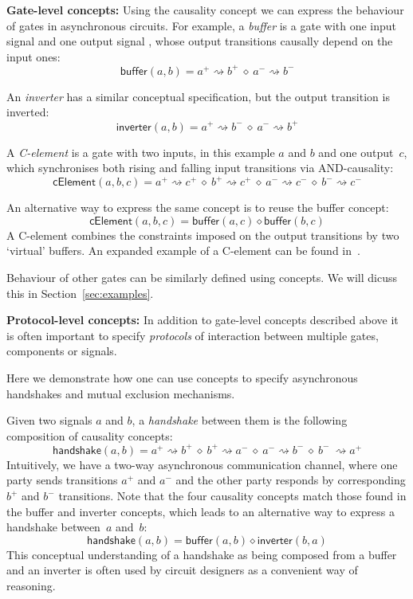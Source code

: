 \documentclass[british,conference,compsoc]{IEEEtran}
\begin{document}
\textbf{Gate-level concepts:} Using the causality concept we can express
the behaviour of gates in asynchronous circuits. For example, a \emph{buffer}
is a gate with one input signal and one output signal ,
whose output transitions causally depend on the input ones:
\[
\mathsf{buffer}(a, b)=a^{+}\rightsquigarrow b^{+}\ \diamond\
a^{-}\rightsquigarrow b^{-}
\]

\noindent An \emph{inverter} has a similar conceptual specification, but the
output transition is inverted:
\[
\mathsf{inverter}(a, b)=a^{+}\rightsquigarrow b^{-}\ \diamond\
a^{-}\rightsquigarrow b^{+}
\]

\noindent A \emph{C-element} is a gate with two inputs, in this example $a$ and $b$ and one
output~$c$, which synchronises both rising and falling input transitions
via AND-causality:
\[
\mathsf{cElement}(a, b, c)=a^{+}\!\rightsquigarrow\! c^{+}\ \diamond\
b^{+}\!\rightsquigarrow\! c^{+}\ \diamond\ a^{-}\!\rightsquigarrow\! c^{-}\
\diamond\ b^{-}\!\rightsquigarrow\! c^{-}
\]

An alternative way to express the same concept is to reuse the buffer concept:
\[
\mathsf{cElement}(a, b, c)=\mathsf{buffer}(a, c) \diamond \mathsf{buffer}(b, c)
\]
A C-element combines the constraints imposed on the output
transitions by two `virtual' buffers. An expanded example of a C-element can be
found in~\cite{2015_Beaumont_MEMOCODE}.

Behaviour of other gates can be similarly defined using concepts. We will dicuss
this in Section~\ref{sec:examples}.

\textbf{Protocol-level concepts:} In addition to gate-level concepts
described above it is often important to specify \emph{protocols}
of interaction between multiple gates, components or signals. 

Here we demonstrate how one can use concepts to specify asynchronous handshakes
and mutual exclusion mechanisms.

Given two signals $a$ and $b$, a \emph{handshake} between them is
the following composition of causality concepts:
\[
\mathsf{handshake}(a, b)=a^{+}\!\rightsquigarrow\! b^{+}\ \diamond\
b^{+}\!\rightsquigarrow\! a^{-}\ \diamond\ a^{-}\!\rightsquigarrow\! b^{-}\
\diamond\ b^{-}\ \rightsquigarrow\! a^{+}
\]
Intuitively, we have a two-way asynchronous communication channel,
where one party sends transitions $a^{+}$ and $a^{-}$ and the other
party responds by corresponding $b^{+}$ and $b^{-}$ transitions.
Note that the four causality concepts match those found
in the buffer and inverter concepts, which leads to an alternative
way to express a handshake between~$a$ and~$b$:
\[
\mathsf{handshake}(a, b)=\mathsf{buffer}(a, b) \diamond\mathsf{inverter}(b, a)
\]
This conceptual understanding of a handshake as being composed
from a buffer and an inverter is often used by circuit designers as
a convenient way of reasoning.
\end{document}
